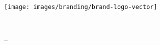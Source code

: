 \vspace{-0.5cm}
\texttt{[image: images/branding/brand-logo-vector]}

\vspace{8.5cm}
\begin{minipage}{\textwidth}
    \sffamily

    \vspace{2mm}
    {\YUGE \raggedleft\bookletunittitle\\}

    \vspace{1mm}
    {\huge \raggedleft\coursetitle { }-- \formattedunittitle\\}

    \vspace{2mm}
    {\small \raggedleft\bookletsubtitle\\}
\end{minipage}
